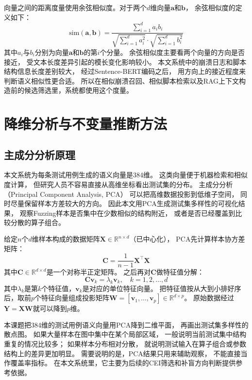 向量之间的距离度量使用余弦相似度。对于两个$d$维向量$\mathbf{a}$和$\mathbf{b}$，
余弦相似度的定义如下：
\begin{equation}
\label{eq:cosine}
\text{sim}(\mathbf{a}, \mathbf{b}) = \frac{\sum_{i=1}^{d} a_i b_i}{\sqrt{\sum_{i=1}^{d} a_i^2} \cdot \sqrt{\sum_{i=1}^{d} b_i^2}}
\end{equation}
其中$a_i$与$b_i$分别为向量$\mathbf{a}$和$\mathbf{b}$的第$i$个分量。
余弦相似度主要看两个向量的方向是否接近，
受文本长度差异引起的模长变化影响较小。
本文系统中的崩溃日志和脚本结构信息长度差别较大，
经过Sentence-BERT编码之后，
用方向上的接近程度来判断语义相似性更合适。
所以在相似崩溃召回、相似脚本检索以及RAG上下文构造前的候选筛选里，系统都使用这个度量。

\section{降维分析与不变量推断方法}

\subsection{主成分分析原理}

本文系统为每条测试用例生成的语义向量是384维。
这类向量便于机器检索和相似度计算，
但研究人员不容易直接从高维坐标看出测试集的分布。
主成分分析（Principal Component Analysis, PCA）\cite{ref_pca}
可以把高维数据投影到低维子空间，
同时尽量保留样本方差较大的方向。
因此本文用PCA生成测试集多样性的可视化结果，
观察Fuzzing样本是否集中在少数相似的结构附近，
或者是否已经覆盖到比较分散的算子组合。

给定$n$个$d$维样本构成的数据矩阵$\mathbf{X} \in \mathbb{R}^{n \times d}$（已中心化），
PCA先计算样本协方差矩阵：
\begin{equation}
\label{eq:cov}
\mathbf{C} = \frac{1}{n-1}\mathbf{X}^{\top}\mathbf{X}
\end{equation}
其中$\mathbf{C} \in \mathbb{R}^{d \times d}$是一个对称半正定矩阵。
之后再对$\mathbf{C}$做特征值分解：
\begin{equation}
\label{eq:eigen}
\mathbf{C}\mathbf{v}_k = \lambda_k \mathbf{v}_k, \quad k = 1, 2, \ldots, d
\end{equation}
其中$\lambda_k$是第$k$个特征值，$\mathbf{v}_k$是对应的单位特征向量。
把特征值按从大到小排好序后，取前$p$个特征向量组成投影矩阵$\mathbf{W} = [\mathbf{v}_1, \ldots, \mathbf{v}_p] \in \mathbb{R}^{d \times p}$。
原始数据经过$\mathbf{Y} = \mathbf{X}\mathbf{W}$就可以降到$p$维。

本课题把384维的测试用例语义向量用PCA降到二维平面，
再画出测试集多样性的散点图。
如果大量样本在图中集中在某个局部区域，
一般说明当前测试集中结构重复的情况比较多；
如果样本分布相对分散，
就说明测试输入在算子组合或参数结构上的差异更加明显。
需要说明的是，PCA结果只用来辅助观察，
不能直接当作覆盖率指标。
在本文系统里，它主要为后续的CEI筛选和补盲方向判断提供参考依据。

